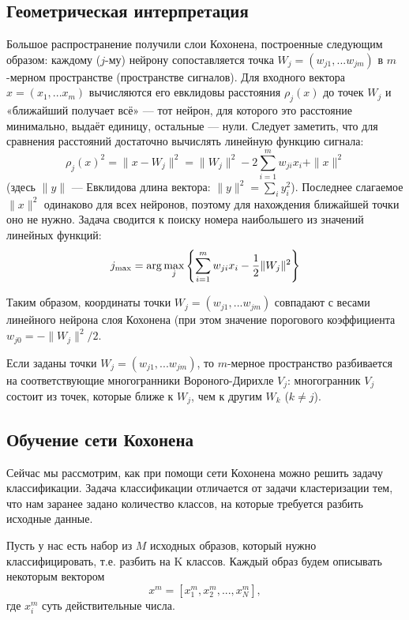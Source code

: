 \documentclass[a4paper,12pt]{article}
\begin{document}
\subsection{Геометрическая интерпретация}

Большое распространение получили слои Кохонена, построенные следующим образом: каждому ($j$-му) нейрону сопоставляется точка $W_{j}=(w_{{j1}},...w_{{jm}})$ в $m$-мерном пространстве (пространстве сигналов). Для входного вектора $x=(x_{1},...x_{m})$ вычисляются его евклидовы расстояния $\rho _{j}(x)$ до точек $W_j$ и «ближайший получает всё» — тот нейрон, для которого это расстояние минимально, выдаёт единицу, остальные — нули. Следует заметить, что для сравнения расстояний достаточно вычислять линейную функцию сигнала:
\[
  \rho _{j}(x)^{2}=\|x-W_{j}\|^{2}=\|W_{j}\|^{2}-2\sum _{{i=1}}^{m}w_{{ji}}x_{i}+\|x\|^{2}
\]
(здесь $\|y\|$ — Евклидова длина вектора: $\|y\|^{2}=\sum _{i}y_{i}^{2}$). Последнее слагаемое $\|x\|^{2}$ одинаково для всех нейронов, поэтому для нахождения ближайшей точки оно не нужно. Задача сводится к поиску номера наибольшего из значений линейных функций:
\[
  j_{\max }={\rm {arg}}\max _{j}\left\{\sum _{i=1}^{m}w_{ji}x_{i}-{\frac {1}{2}}\|W_{j}\|^{2}\right\}
\]

Таким образом, координаты точки ${\displaystyle W_{j}=(w_{j1},...w_{jm})}$ совпадают с весами линейного нейрона слоя Кохонена (при этом значение порогового коэффициента ${\displaystyle w_{j0}=-\|W_{j}\|^{2}/2}$.

Если заданы точки $W_{j}=(w_{{j1}},...w_{{jm}})$, то $m$-мерное пространство разбивается на соответствующие многогранники Вороного-Дирихле $V_{j}$: многогранник $V_{j}$ состоит из точек, которые ближе к $W_j$, чем к другим $W_{k}$ ($k\neq j$).
\cite{wikipedia_network}

\subsection{Обучение сети Кохонена}

Сейчас мы рассмотрим, как при помощи сети Кохонена можно решить задачу классификации. Задача классификации отличается от задачи кластеризации тем, что нам заранее задано количество классов, на которые требуется разбить исходные данные.

Пусть у нас есть набор из $M$ исходных образов, который нужно классифицировать, т.е. разбить на K классов. Каждый образ будем описывать некоторым вектором
\[
  x^m = [x_1^m, x_2^m, ..., x_N^m],
\]
где $x_i^m$ суть действительные числа.
\end{document}
